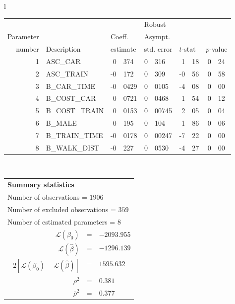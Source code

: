   \begin{tabular}{l}
\begin{tabular}{rlr@{.}lr@{.}lr@{.}lr@{.}l}
         &                       &   \multicolumn{2}{l}{}    & \multicolumn{2}{l}{Robust}  &     \multicolumn{4}{l}{}   \\
Parameter &                       &   \multicolumn{2}{l}{Coeff.}      & \multicolumn{2}{l}{Asympt.}  &     \multicolumn{4}{l}{}   \\
number &  Description                     &   \multicolumn{2}{l}{estimate}      & \multicolumn{2}{l}{std. error}  &   \multicolumn{2}{l}{$t$-stat}  &   \multicolumn{2}{l}{$p$-value}   \\

\hline

1 & ASC_CAR & 0&374 & 0&316 & 1&18 & 0&24\\
2 & ASC_TRAIN & -0&172 & 0&309 & -0&56 & 0&58\\
3 & B_CAR_TIME & -0&0429 & 0&0105 & -4&08 & 0&00\\
4 & B_COST_CAR & 0&0721 & 0&0468 & 1&54 & 0&12\\
5 & B_COST_TRAIN & 0&0153 & 0&00745 & 2&05 & 0&04\\
6 & B_MALE & 0&195 & 0&104 & 1&86 & 0&06\\
7 & B_TRAIN_TIME & -0&0178 & 0&00247 & -7&22 & 0&00\\
8 & B_WALK_DIST & -0&227 & 0&0530 & -4&27 & 0&00\\
\hline
\end{tabular}
\\
\begin{tabular}{rcl}
\multicolumn{3}{l}{\bf Summary statistics}\\
\multicolumn{3}{l}{ Number of observations = $1906$} \\
\multicolumn{3}{l}{ Number of excluded observations = $359$} \\
\multicolumn{3}{l}{ Number of estimated  parameters = $8$} \\
 $\mathcal{L}(\beta_0)$ &=&  $-2093.955$ \\
 $\mathcal{L}(\hat{\beta})$ &=& $-1296.139 $  \\
 $-2[\mathcal{L}(\beta_0) -\mathcal{L}(\hat{\beta})]$ &=& $1595.632$ \\
    $\rho^2$ &=&   $0.381$ \\
    $\bar{\rho}^2$ &=&    $0.377$ \\
\end{tabular}
  \end{tabular}
